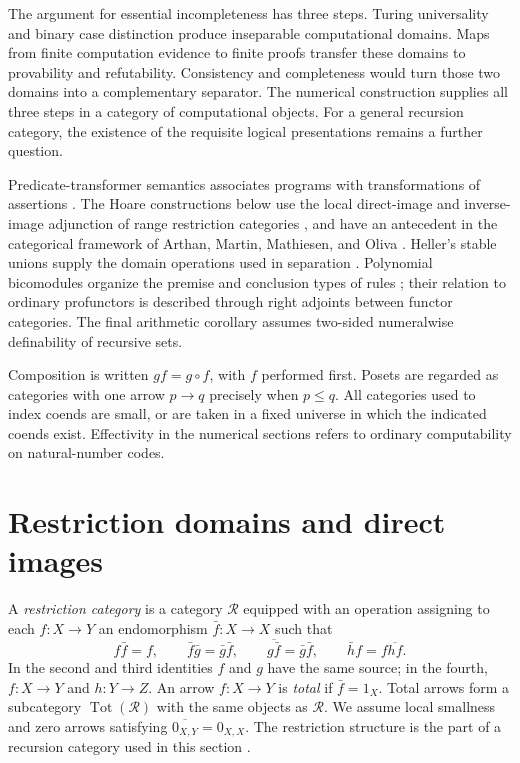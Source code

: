 \documentclass[11pt]{article}
\theoremstyle{definition}
\theoremstyle{remark}
\newcommand{\R}{\mathscr R}
\newcommand{\Tot}{\operatorname{Tot}}
\begin{document}
The argument for essential incompleteness has three steps. Turing
universality and binary case distinction produce inseparable computational
domains. Maps from finite computation evidence to finite proofs transfer
these domains to provability and refutability. Consistency and completeness
would turn those two domains into a complementary separator. The numerical
construction supplies all three steps in a category of computational
objects. For a general recursion category, the existence of the requisite
logical presentations remains a further question.

Predicate-transformer semantics associates programs with transformations
of assertions \cite{Dijkstra,DijkstraScholten}. The Hoare constructions
below use the local direct-image and inverse-image adjunction of range
restriction categories \cite[Proposition~8.2]{CockettGarner}, and have an
antecedent in the categorical framework of Arthan, Martin, Mathiesen, and
Oliva \cite{ArthanEtAl}. Heller's stable unions supply the domain
operations used in separation \cite[\S6]{Heller}. Polynomial bicomodules
organize the premise and conclusion types of rules
\cite[\S8.3]{NS2024}; their relation to ordinary profunctors is described
through right adjoints between functor categories. The final arithmetic
corollary assumes two-sided numeralwise definability of recursive sets.

Composition is written $gf=g\circ f$, with $f$ performed first. Posets are
regarded as categories with one arrow $p\to q$ precisely when $p\le q$.
All categories used to index coends are small, or are taken in a fixed
universe in which the indicated coends exist. Effectivity in the numerical
sections refers to ordinary computability on natural-number codes.


\section{Restriction domains and direct images}\label{hp:domains}

A \emph{restriction
category} is a category $\R$ equipped with an operation assigning to each
$f:X\to Y$ an endomorphism $\bar f:X\to X$ such that
\begin{equation}\label{hp:restriction-axioms}
 f\bar f=f,\qquad
 \bar f\bar g=\bar g\bar f,\qquad
 \overline{g\bar f}=\bar g\bar f,\qquad
 \bar h f=f\overline{hf}.
\end{equation}
In the second and third identities $f$ and $g$ have the same source; in
the fourth, $f:X\to Y$ and $h:Y\to Z$. An arrow $f:X\to Y$ is
\emph{total} if $\bar f=1_X$. Total arrows form a subcategory
$\Tot(\R)$ with the same objects as $\R$. We assume local smallness and
zero arrows satisfying $\overline{0_{X,Y}}=0_{X,X}$. The restriction
structure is the part of a recursion category used in this section
\cite{CockettLack}.
\end{document}

